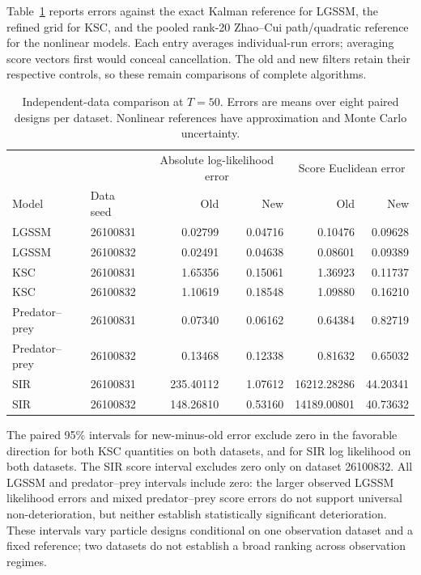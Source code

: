 Table~\ref{tab:covariance-proposal-independent} reports errors against the exact
Kalman reference for LGSSM, the refined grid for KSC, and the pooled rank-20
Zhao--Cui path/quadratic reference for the nonlinear models. Each entry averages
individual-run errors; averaging score vectors first would conceal cancellation.
The old and new filters retain their respective controls, so these remain
comparisons of complete algorithms.

\begin{table}[htbp]
\centering
\small
\setlength{\tabcolsep}{4pt}
\begin{tabular}{llrrrr}
\toprule
& & \multicolumn{2}{c}{Absolute log-likelihood error}
& \multicolumn{2}{c}{Score Euclidean error} \\
Model & Data seed & Old & New & Old & New \\
\midrule
LGSSM & 26100831 & 0.02799 & 0.04716 & 0.10476 & 0.09628 \\
LGSSM & 26100832 & 0.02491 & 0.04638 & 0.08601 & 0.09389 \\
KSC & 26100831 & 1.65356 & 0.15061 & 1.36923 & 0.11737 \\
KSC & 26100832 & 1.10619 & 0.18548 & 1.09880 & 0.16210 \\
Predator--prey & 26100831 & 0.07340 & 0.06162 & 0.64384 & 0.82719 \\
Predator--prey & 26100832 & 0.13468 & 0.12338 & 0.81632 & 0.65032 \\
SIR & 26100831 & 235.40112 & 1.07612 & 16212.28286 & 44.20341 \\
SIR & 26100832 & 148.26810 & 0.53160 & 14189.00801 & 40.73632 \\
\bottomrule
\end{tabular}
\caption{Independent-data comparison at \(T=50\). Errors are means over eight
paired designs per dataset. Nonlinear references have approximation and Monte
Carlo uncertainty.}
\label{tab:covariance-proposal-independent}
\end{table}

The paired 95\% intervals for new-minus-old error exclude zero in the favorable
direction for both KSC quantities on both datasets, and for SIR log likelihood
on both datasets. The SIR score interval excludes zero only on dataset
26100832. All LGSSM and predator--prey intervals include zero: the larger
observed LGSSM likelihood errors and mixed predator--prey score errors do not
support universal non-deterioration, but neither establish statistically
significant deterioration. These intervals vary particle designs conditional
on one observation dataset and a fixed reference; two datasets do not establish
a broad ranking across observation regimes.

